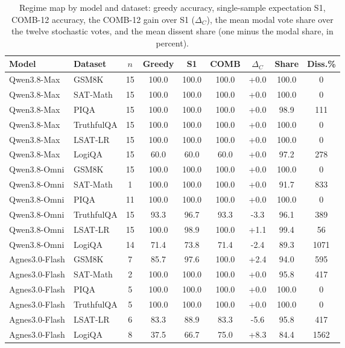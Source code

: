 \documentclass[preprint,12pt]{elsarticle}
\begin{document}
\begin{table}[htbp]
\centering
\footnotesize
\caption{Regime map by model and dataset: greedy accuracy, single-sample expectation S1, COMB-12 accuracy, the COMB-12 gain over S1 ($\Delta_C$), the mean modal vote share over the twelve stochastic votes, and the mean dissent share (one minus the modal share, in percent).}

\scriptsize
\begin{tabular}{l l c c c c c c c}
\toprule
Model & Dataset & $n$ & Greedy & S1 & COMB & $\Delta_C$ & Share & Diss.\% \\
\midrule
Qwen3.8-Max & GSM8K & 15 & 100.0 & 100.0 & 100.0 & +0.0 & 100.0 & 0 \\
Qwen3.8-Max & SAT-Math & 15 & 100.0 & 100.0 & 100.0 & +0.0 & 100.0 & 0 \\
Qwen3.8-Max & PIQA & 15 & 100.0 & 100.0 & 100.0 & +0.0 & 98.9 & 111 \\
Qwen3.8-Max & TruthfulQA & 15 & 100.0 & 100.0 & 100.0 & +0.0 & 100.0 & 0 \\
Qwen3.8-Max & LSAT-LR & 15 & 100.0 & 100.0 & 100.0 & +0.0 & 100.0 & 0 \\
Qwen3.8-Max & LogiQA & 15 & 60.0 & 60.0 & 60.0 & +0.0 & 97.2 & 278 \\
\midrule
Qwen3.8-Omni & GSM8K & 15 & 100.0 & 100.0 & 100.0 & +0.0 & 100.0 & 0 \\
Qwen3.8-Omni & SAT-Math & 1 & 100.0 & 100.0 & 100.0 & +0.0 & 91.7 & 833 \\
Qwen3.8-Omni & PIQA & 11 & 100.0 & 100.0 & 100.0 & +0.0 & 100.0 & 0 \\
Qwen3.8-Omni & TruthfulQA & 15 & 93.3 & 96.7 & 93.3 & -3.3 & 96.1 & 389 \\
Qwen3.8-Omni & LSAT-LR & 15 & 100.0 & 98.9 & 100.0 & +1.1 & 99.4 & 56 \\
Qwen3.8-Omni & LogiQA & 14 & 71.4 & 73.8 & 71.4 & -2.4 & 89.3 & 1071 \\
\midrule
Agnes3.0-Flash & GSM8K & 7 & 85.7 & 97.6 & 100.0 & +2.4 & 94.0 & 595 \\
Agnes3.0-Flash & SAT-Math & 2 & 100.0 & 100.0 & 100.0 & +0.0 & 95.8 & 417 \\
Agnes3.0-Flash & PIQA & 5 & 100.0 & 100.0 & 100.0 & +0.0 & 100.0 & 0 \\
Agnes3.0-Flash & TruthfulQA & 5 & 100.0 & 100.0 & 100.0 & +0.0 & 100.0 & 0 \\
Agnes3.0-Flash & LSAT-LR & 6 & 83.3 & 88.9 & 83.3 & -5.6 & 95.8 & 417 \\
Agnes3.0-Flash & LogiQA & 8 & 37.5 & 66.7 & 75.0 & +8.3 & 84.4 & 1562 \\

\end{tabular}
\end{table}
\end{document}
